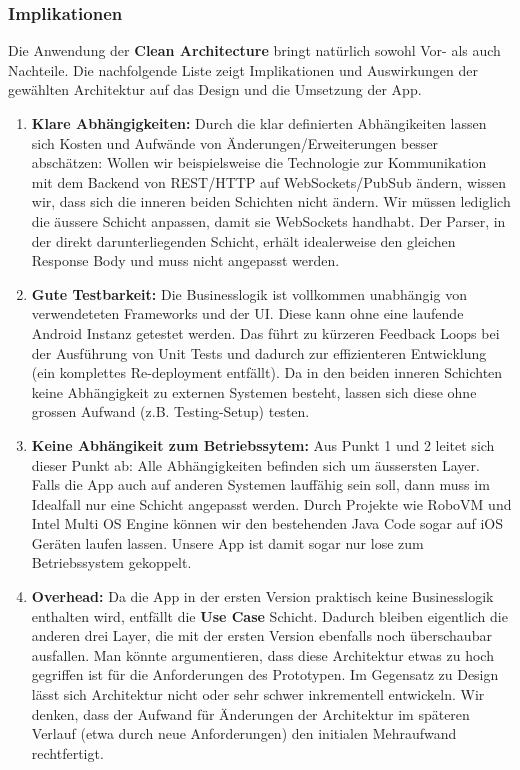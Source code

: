 \documentclass[a4paper,10pt,xetex]{article}
\begin{document}
\subsubsection{Implikationen}\label{implications}
Die Anwendung der \textbf{Clean Architecture} bringt natürlich sowohl Vor- als
auch Nachteile. Die nachfolgende Liste zeigt Implikationen und Auswirkungen der
gewählten Architektur auf das Design und die Umsetzung der App.
\begin{enumerate}
  \item \textbf{Klare Abhängigkeiten:} Durch die klar definierten Abhängikeiten
    lassen sich Kosten und Aufwände von Änderungen/Erweiterungen besser abschätzen:
    Wollen wir beispielsweise die Technologie zur Kommunikation mit dem
    Backend von REST/HTTP auf WebSockets/PubSub ändern, wissen wir, dass sich
    die inneren beiden Schichten nicht ändern. Wir müssen lediglich die äussere
    Schicht anpassen, damit sie WebSockets handhabt. Der Parser, in der direkt
    darunterliegenden Schicht, erhält idealerweise den gleichen Response Body
    und muss nicht angepasst werden.
  \item \textbf{Gute Testbarkeit:} Die Businesslogik ist vollkommen unabhängig
    von verwendeteten Frameworks und der UI. Diese kann ohne eine laufende
    Android Instanz getestet werden. Das führt zu kürzeren Feedback Loops
    bei der Ausführung von Unit Tests und dadurch zur effizienteren Entwicklung
    (ein komplettes Re-deployment entfällt).
    Da in den beiden inneren Schichten keine Abhängigkeit zu externen Systemen
    besteht, lassen sich diese ohne grossen Aufwand (z.B. Testing-Setup) testen.
  \item \textbf{Keine Abhängikeit zum Betriebssytem:} Aus Punkt 1 und 2
    leitet sich dieser Punkt ab: Alle Abhängigkeiten befinden sich um
    äussersten Layer. Falls die App auch auf anderen Systemen lauffähig sein soll, dann muss im Idealfall nur eine Schicht angepasst werden. Durch Projekte wie RoboVM \cite{RV} und Intel Multi OS Engine \cite{MOE} können wir den bestehenden Java Code
    sogar auf iOS Geräten laufen lassen. Unsere App ist damit sogar nur lose
    zum Betriebssystem gekoppelt.
  \item \textbf{Overhead:} Da die App in der ersten Version praktisch keine
    Businesslogik enthalten wird, entfällt die \textbf{Use Case} Schicht.
    Dadurch bleiben eigentlich die anderen drei Layer, die mit der ersten
    Version ebenfalls noch überschaubar ausfallen. Man könnte argumentieren,
    dass diese Architektur etwas zu hoch gegriffen ist für die Anforderungen
    des Prototypen. Im Gegensatz zu Design lässt sich Architektur nicht oder
    sehr schwer inkrementell entwickeln. Wir denken, dass der Aufwand für Änderungen
    der Architektur im späteren Verlauf (etwa durch neue Anforderungen) den
    initialen Mehraufwand rechtfertigt.
\end{enumerate}
\end{document}
